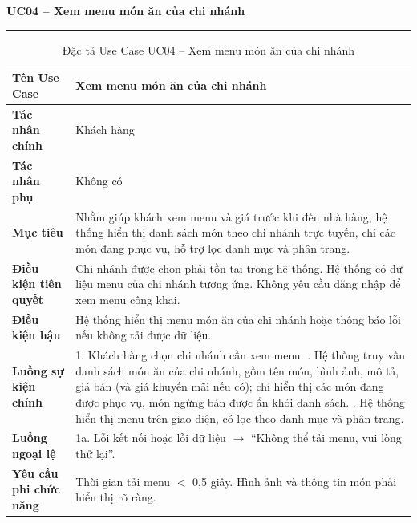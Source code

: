 ﻿\documentclass[../DoAn.tex]{subfiles}
\newcommand{\UCtitle}[1]{%
    \vspace{0.5em}
    {\large\bfseries #1}\\[-0.5em]
    \rule{\textwidth}{0.5pt}
    \vspace{0.3em}
}
\begin{document}
\begin{table}[H]
\UCtitle{UC04 – Xem menu món ăn của chi nhánh}
\centering
\begin{tabular}{|p{4cm}|p{10cm}|}
\hline
\textbf{Tên Use Case} & Xem menu món ăn của chi nhánh \\ \hline
\textbf{Tác nhân chính} & Khách hàng \\ \hline
\textbf{Tác nhân phụ} & Không có \\ \hline
\textbf{Mục tiêu} &
Nhằm giúp khách xem menu và giá trước khi đến nhà hàng, hệ thống hiển thị danh sách món theo chi nhánh trực tuyến, chỉ các món đang phục vụ, hỗ trợ lọc danh mục và phân trang.
\\ \hline
\textbf{Điều kiện tiên quyết} &
Chi nhánh được chọn phải tồn tại trong hệ thống. Hệ thống có dữ liệu menu của chi nhánh tương ứng. Không yêu cầu đăng nhập để xem menu công khai.
\\ \hline
\textbf{Điều kiện hậu} &
Hệ thống hiển thị menu món ăn của chi nhánh hoặc thông báo lỗi nếu không tải được dữ liệu.
\\ \hline
\textbf{Luồng sự kiện chính} &
1. Khách hàng chọn chi nhánh cần xem menu. \newline
2. Hệ thống truy vấn danh sách món ăn của chi nhánh, gồm tên món, hình ảnh, mô tả, giá bán (và giá khuyến mãi nếu có); chỉ hiển thị các món đang được phục vụ, món ngừng bán được ẩn khỏi danh sách. \newline
3. Hệ thống hiển thị menu trên giao diện, có lọc theo danh mục và phân trang.
\\ \hline
\textbf{Luồng ngoại lệ} &
1a. Lỗi kết nối hoặc lỗi dữ liệu $\rightarrow$ ``Không thể tải menu, vui lòng thử lại''.
\\ \hline
\textbf{Yêu cầu phi chức năng} &
Thời gian tải menu $<$ 0,5 giây. Hình ảnh và thông tin món phải hiển thị rõ ràng.
\\ \hline
\end{tabular}
\caption{Đặc tả Use Case UC04 – Xem menu món ăn của chi nhánh}
\end{table}
\end{document}
